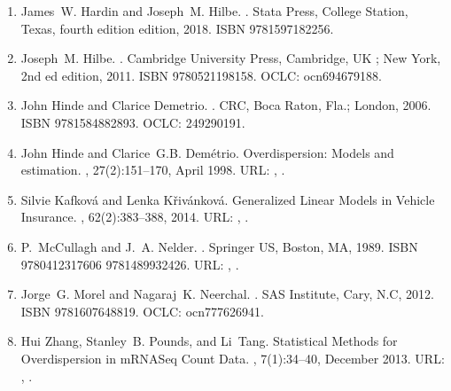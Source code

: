 \documentclass[letterpaper,10pt,english]{sphinxmanual}
\begin{document}
\begin{enumerate}
\item {} 
James W. Hardin and Joseph M. Hilbe. . Stata Press, College Station, Texas, fourth edition edition, 2018. ISBN 9781597182256.

\item {} 
Joseph M. Hilbe. . Cambridge University Press, Cambridge, UK ; New York, 2nd ed edition, 2011. ISBN 9780521198158. OCLC: ocn694679188.

\item {} 
John Hinde and Clarice Demetrio. . CRC, Boca Raton, Fla.; London, 2006. ISBN 9781584882893. OCLC: 249290191.

\item {} 
John Hinde and Clarice G.B. Demétrio. Overdispersion: Models and estimation. , 27(2):151–170, April 1998. URL: , .

\item {} 
Silvie Kafková and Lenka Křivánková. Generalized Linear Models in Vehicle Insurance. , 62(2):383–388, 2014. URL: , .

\item {} 
P. McCullagh and J. A. Nelder. . Springer US, Boston, MA, 1989. ISBN 9780412317606 9781489932426. URL: , .

\item {} 
Jorge G. Morel and Nagaraj K. Neerchal. . SAS Institute, Cary, N.C, 2012. ISBN 9781607648819. OCLC: ocn777626941.

\item {} 
Hui Zhang, Stanley B. Pounds, and Li Tang. Statistical Methods for Overdispersion in mRNA\sphinxhyphen{}Seq Count Data. , 7(1):34–40, December 2013. URL: , .


\end{enumerate}
\end{document}
